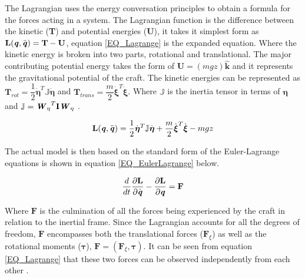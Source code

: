 The Lagrangian uses the energy conversation principles to obtain a formula for the forces acting in a system. The Lagrangian function is the difference between the kinetic (\textbf{T}) and potential energies (\textbf{U}), it takes it simplest form as $ \textbf{L}( \textbf{\textit{q}}, \ddot{ \textbf{\textit{q}}}) = \textbf{T} - \textbf{U}$, equation \eqref{EQ_Lagrange} is the expanded equation. 
Where the kinetic energy is broken into two parts, rotational and translational. The major contributing potential energy takes the form of $\textbf{U} = (mgz) \hat{\textbf{k}}$ and it represents the gravitational potential of the craft. The kinetic energies can be represented as $\textbf{T}_{rot} = \dfrac{1}{2} \dot{\boldsymbol{\eta}}^T \mathbb{J} \dot{\boldsymbol{\eta}}$ and $\textbf{T}_{trans} = \dfrac{m}{2} \dot{\boldsymbol{\xi}}^T \dot{\boldsymbol{\xi}}$. Where $\mathbb{J}$ is the inertia tensor in terms of $\boldsymbol{\eta}$ and $\mathbb{J} = {\textbf{\textit{W}}_\eta}^T \textbf{I} \textbf{\textit{W}}_\eta$ \cite{Luukkonen, Modelling}.

\begin{eqnarray}
\textbf{L}( \textbf{\textit{q}}, \ddot{\textbf{\textit{q}}}) =  \dfrac{1}{2} \dot{\boldsymbol{\eta}}^T \mathbb{J} \dot{\boldsymbol{\eta}} + \dfrac{m}{2} \dot{\boldsymbol{\xi}}^T \dot{\boldsymbol{\xi}} - mgz
\label{EQ_Lagrange}
\end{eqnarray}

The actual model is then based on the standard form of the Euler-Lagrange equations is shown in equation \eqref{EQ_EulerLagrange} below.

\begin{equation}
\dfrac{d}{dt} \dfrac{\partial \textbf{L}}{\partial \dot{\textbf{\textit{q}}}} -  \dfrac{\partial \textbf{L}}{\partial \textbf{\textit{q}}}= \textbf{F}
\label{EQ_EulerLagrange}
\end{equation}

Where $\textbf{F}$ is the culmination of all the forces being experienced by the craft in relation to the inertial frame. Since the Lagrangian accounts for all the degrees of freedom, $\textbf{F}$ encompasses both the translational forces ($\textbf{F}_\xi$) as well as the rotational moments ($\boldsymbol{\tau}$), $\textbf{F} = (\textbf{F}_\xi, \boldsymbol{\tau})$. It can be seen from equation \eqref{EQ_Lagrange} that these two forces can be observed independently from each other \cite{RealTime}.

